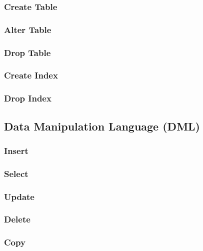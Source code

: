 \begin{multicols}{2}
        \subsubsection{Create Table}
            
        \subsubsection{Alter Table}
            
        \subsubsection{Drop Table}
            
        \subsubsection{Create Index}
            
        \subsubsection{Drop Index}
            
    \subsection{Data Manipulation Language (DML)}
        \subsubsection{Insert}
            
        \subsubsection{Select}
            
        \subsubsection{Update}
            
        \subsubsection{Delete}
            
        \subsubsection{Copy}
            

\end{multicols}
